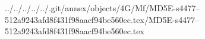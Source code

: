 ../../../../../.git/annex/objects/4G/Mf/MD5E-s4477--512a9243afd8f431f98aacf94be560ec.tex/MD5E-s4477--512a9243afd8f431f98aacf94be560ec.tex
